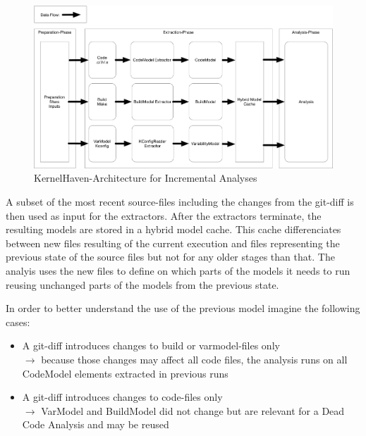 \documentclass[a4paper]{article}
\begin{document}
\begin{figure}[htbp] 
  \centering
  \begin{minipage}[b]{1\textwidth} 
    \caption[KernelHaven-Architecture-Incremental]{KernelHaven-Architecture for Incremental Analyses}\label{fig:KernelHaven-Architecture-Incremental}
    \includegraphics[width=1\textwidth]{img/KernelHavenIncremental.pdf}
  \end{minipage}
\end{figure}

A subset of the most recent source-files including the changes from the git-diff is then used as input for the extractors. After the extractors terminate, the resulting models are stored in a hybrid model cache. This cache differenciates between new files resulting of the current execution and files representing the previous state of the source files but not for any older stages than that. The analyis uses the new files to define on which parts of the models it needs to run reusing unchanged parts of the models from the previous state.

In order to better understand the use of the previous model imagine the following cases:

\begin{itemize}
	\item A git-diff introduces changes to build or varmodel-files only \\
	$\rightarrow$ because those changes may affect all code files, the analysis runs on all CodeModel elements extracted in previous runs
	\item A git-diff introduces changes to code-files only \\
	$\rightarrow$ VarModel and BuildModel did not change but are relevant for a Dead Code Analysis and may be reused
\end{itemize}
\end{document}
